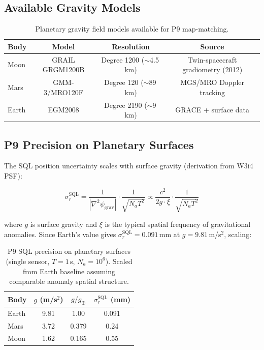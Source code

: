 \documentclass[11pt]{article}
\theoremstyle{definition}
\theoremstyle{remark}
\newcommand{\psigrav}{\psi_{\mathrm{grav}}}
\newcommand{\SQL}{\mathrm{SQL}}
\begin{document}
\subsection{Available Gravity Models}

\begin{table}[H]
\centering
\caption{Planetary gravity field models available for P9 map-matching.}
\label{tab:gravity-models}
\begin{tabular}{@{}lccc@{}}
\toprule
Body & Model & Resolution & Source \\
\midrule
Moon & GRAIL GRGM1200B & Degree 1200 ($\sim$4.5\,km) & Twin-spacecraft gradiometry (2012) \\
Mars & GMM-3/MRO120F & Degree 120 ($\sim$89\,km) & MGS/MRO Doppler tracking \\
Earth & EGM2008 & Degree 2190 ($\sim$9\,km) & GRACE + surface data \\
\bottomrule
\end{tabular}
\end{table}

\subsection{P9 Precision on Planetary Surfaces}

The SQL position uncertainty scales with surface gravity (derivation from
W3i4 PSF):

\begin{equation}
\sigma_r^{\SQL} = \frac{1}{|\nabla^2\psigrav|} \cdot \frac{1}{\sqrt{N_a T^2}}
\propto \frac{c^2}{2g \cdot \xi} \cdot \frac{1}{\sqrt{N_a T^2}}
\label{eq:planetary-sql}
\end{equation}

where $g$ is surface gravity and $\xi$ is the typical spatial frequency
of gravitational anomalies. Since Earth's value gives
$\sigma_r^{\SQL} = 0.091$\,mm at $g = 9.81$\,m/s$^2$, scaling:

\begin{table}[H]
\centering
\caption{P9 SQL precision on planetary surfaces (single sensor, $T=1$\,s,
$N_a = 10^6$). Scaled from Earth baseline assuming comparable anomaly
spatial structure.}
\label{tab:planetary-precision}
\begin{tabular}{@{}lccc@{}}
\toprule
Body & $g$ (m/s$^2$) & $g/g_\oplus$ & $\sigma_r^{\SQL}$ (mm) \\
\midrule
Earth & 9.81 & 1.00 & 0.091 \\
Mars & 3.72 & 0.379 & 0.24 \\
Moon & 1.62 & 0.165 & 0.55 \\
\bottomrule
\end{tabular}
\end{table}
\end{document}
